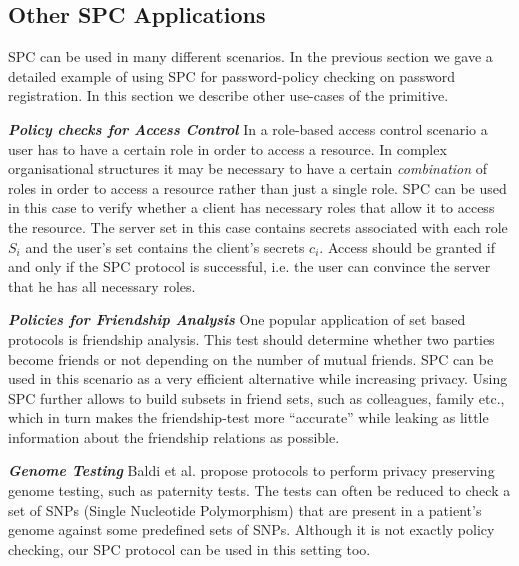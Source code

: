 \subsection{Other SPC Applications}\label{sec:generalisation}
SPC can be used in many different scenarios.
In the previous section we gave a detailed example of using SPC for password-policy checking on password registration.
In this section we describe other use-cases of the primitive.

\noindent\textbf{\textit{Policy checks for Access Control}}
In a role-based access control scenario \cite{FerraioloK09} a user has to have a certain role in order to access a resource.
In complex organisational structures it may be necessary to have a certain \emph{combination} of roles in order to access a resource rather than just a single role.
SPC can be used in this case to verify whether a client has necessary roles that allow it to access the resource.
The server set \cS in this case contains secrets associated with each role $S_i$ and the user's set \cC contains the client's secrets $c_i$.
Access should be granted if and only if the SPC protocol is successful, i.e. the user can convince the server that he has all necessary roles.

\noindent\textbf{\textit{Policies for Friendship Analysis}}
One popular application of set based protocols is friendship analysis.
This test should determine whether two parties become friends or not depending on the number of mutual friends.
SPC can be used in this scenario as a very efficient alternative while increasing privacy.
Using SPC further allows to build subsets in friend sets, such as colleagues, family etc., which in turn makes the friendship-test more ``accurate'' while leaking as little information about the friendship relations as possible.

\noindent\textbf{\textit{Genome Testing}}
Baldi et al. \cite{BaldiBCGT11} propose protocols to perform privacy preserving genome testing, such as paternity tests. 
The tests can often be reduced to check a set of SNPs (Single Nucleotide Polymorphism) that are present in a patient's genome against some predefined sets of SNPs. Although it is not exactly policy checking, our SPC protocol can be used in this setting too. 


